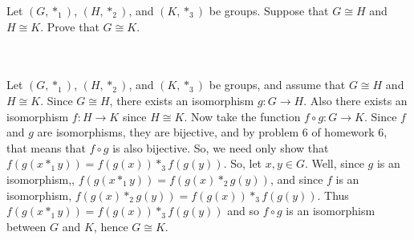 Let $(G,*_1)$, $(H,*_2)$, and $(K,*_3)$ be groups. Suppose that $G\cong H$ and $H\cong K$. Prove that
$G\cong K$.\\\\

\begin{solution}\renewcommand{\qedsymbol}{}\ \\
    Let $(G,*_1)$, $(H,*_2)$, and $(K,*_3)$ be groups, and assume that $G\cong H$ and $H\cong K$. Since
    $G\cong H$, there exists an isomorphism $g:G\rightarrow H$. Also there exists an isomorphism
    $f:H\rightarrow K$ since $H\cong K$. Now take the function $f\circ g:G\rightarrow K$. Since $f$ and
    $g$ are isomorphisms, they are bijective, and by problem 6 of homework 6, that means that $f\circ g$
    is also bijective. So, we need only show that $f(g(x*_1y))=f(g(x))*_3f(g(y))$. So, let $x,y\in G$.
    Well, since $g$ is an isomorphism,, $f(g(x*_1y))=f(g(x)*_2g(y))$, and since $f$ is an isomorphism,
    $f(g(x)*_2g(y))=f(g(x))*_3f(g(y))$. Thus $f(g(x*_1y))=f(g(x))*_3f(g(y))$ and so $f\circ g$ is an
    isomorphism between $G$ and $K$, hence $G\cong K$.

\end{solution}